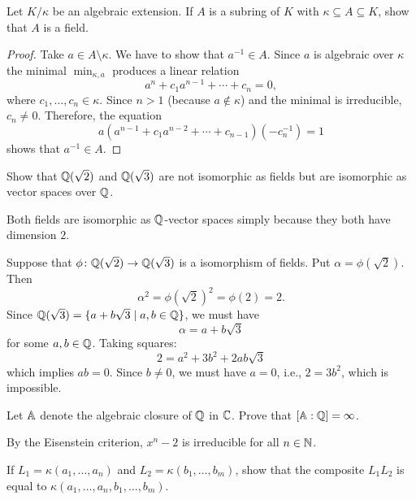 \begin{probl}\label{probl:subring-is-field}
    Let\/ $K/\kappa$ be an algebraic extension. If\/ $A$ is a subring of\/ $K$ with\/ $\kappa \subseteq A \subseteq K$, show that\/ $A$ is a field.
\end{probl}

\begin{proof}
    Take $a\in A\setminus\kappa$. We have to show that $a^{-1}\in A$. Since $a$ is algebraic over $\kappa$ the minimal $\min_{\kappa,a}$ produces a linear relation
    $$
        a^n+c_1a^{n-1}+\cdots+c_n=0,
    $$
    where $c_1,\dots,c_n\in\kappa$. Since $n>1$ (because $a\notin\kappa$) and the minimal is irreducible, $c_n\ne0$. Therefore, the equation
    $$
        a(a^{n-1}+c_1a^{n-2}+\cdots+c_{n-1})(-c_n^{-1})=1
    $$
    shows that $a^{-1}\in A$.
\end{proof}

\begin{probl}
    Show that $\mathbb{Q}(\sqrt2)$ and $\mathbb{Q}(\sqrt3)$ are not isomorphic as fields but are isomorphic as vector spaces over $\mathbb{Q}$.
\end{probl}

\begin{solution}
    Both fields are isomorphic as $\mathbb{Q}$-vector spaces simply because they both have dimension $2$. 

    Suppose that $\phi\colon\mathbb{Q}(\sqrt2)\to\mathbb{Q}(\sqrt3)$ is a isomorphism of fields. Put $\alpha=\phi(\sqrt2)$. Then 
    $$
        \alpha^2=\phi(\sqrt2)^2=\phi(2)=2.
    $$
    Since $\mathbb{Q}(\sqrt3)=\{a+b\sqrt3\mid a,b\in\mathbb{Q}\}$, we must have
    $$
        \alpha = a + b\sqrt3
    $$
    for some $a,b\in\mathbb{Q}$. Taking squares:
    $$
        2 = a^2+3b^2+2ab\sqrt3
    $$
    which implies $ab=0$. Since $b\ne0$, we must have $a=0$, i.e., $2=3b^2$, which is impossible.
\end{solution}

\begin{probl}
    Let\/ $\mathbb A$ denote the algebraic closure of\/ $\mathbb{Q}$ in\/ $\mathbb{C}$. Prove that\/ $[\mathbb A:\mathbb{Q}]=\infty$.
\end{probl}

\begin{solution}
    By the Eisenstein criterion, $x^n-2$ is irreducible for all $n\in\mathbb{N}$.
\end{solution}


\begin{probl}
    If\/ $L_1 = \kappa(a_1, \dots, a_n)$ and\/ $L_2 = \kappa(b_1, \dots, b_m)$, show that the composite\/ $L_1 L_2$ is equal to\/ $\kappa(a_1, \dots, a_n, b_1, \dots, b_m)$.
\end{probl}

